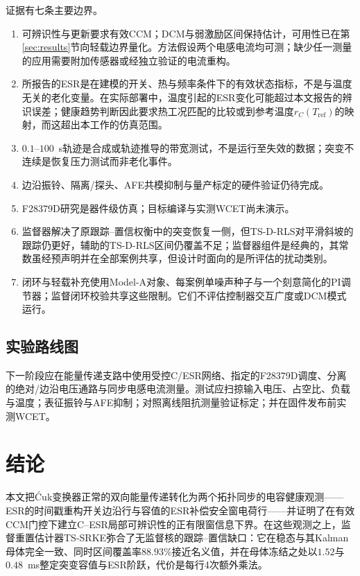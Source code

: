 \documentclass[zihao=5,a4paper]{ctexart}
\DeclareRobustCommand{\Cuk}{\mbox{\'{C}uk}}
\newcommand{\TSRLS}{TS-D-RLS}
\newcommand{\TSSRKE}{TS-SRKE}
\begin{document}
证据有七条主要边界。
\begin{enumerate}
\item 可辨识性与更新要求有效CCM；DCM与弱激励区间保持估计，可用性已在第\ref{sec:results}节向轻载边界量化。方法假设两个电感电流均可测；缺少任一测量的应用需要附加传感器或经独立验证的电流重构。
\item 所报告的ESR是在建模的开关、热与频率条件下的有效状态指标，不是与温度无关的老化变量。在实际部署中，温度引起的ESR变化可能超过本文报告的辨识误差；健康趋势判断因此要求热工况匹配的比较或到参考温度$r_C(T_{\mathrm{ref}})$的映射，而这超出本工作的仿真范围。
\item $0.1$--$100$~s轨迹是合成或轨迹推导的带宽测试，不是运行至失效的数据；突变不连续是恢复压力测试而非老化事件。
\item 边沿振铃、隔离/探头、AFE共模抑制与量产标定的硬件验证仍待完成。
\item F28379D研究是器件级仿真；目标编译与实测WCET尚未演示。
\item 监督器解决了原跟踪--置信权衡中的突变恢复一侧，但\TSRLS{}对平滑斜坡的跟踪仍更好，辅助的\TSRLS{}区间仍覆盖不足；监督器组件是经典的，其常数虽经预声明并在全部案例共享，但设计时面向的是所评估的扰动类别。
\item 闭环与轻载补充使用Model-A对象、每案例单噪声种子与一个刻意简化的PI调节器；监督闭环校验共享这些限制。它们不评估控制器交互广度或DCM模式运行。
\end{enumerate}

\subsection{实验路线图}

下一阶段应在能量传递支路中使用受控C/ESR网络、指定的F28379D调度、分离的绝对/边沿电压通路与同步电感电流测量。测试应扫掠输入电压、占空比、负载与温度；表征振铃与AFE抑制；对照离线阻抗测量验证标定；并在固件发布前实测WCET。

\section{结论}
\label{sec:conclusion}

本文把\Cuk{}变换器正常的双向能量传递转化为两个拓扑同步的电容健康观测——ESR的时间戳重构开关边沿行与容值的ESR补偿安全窗电荷行——并证明了在有效CCM门控下建立C--ESR局部可辨识性的正有限窗信息下界。在这些观测之上，监督重置估计器\TSSRKE{}弥合了无监督核的跟踪--置信缺口：它在稳态与其Kalman母体完全一致、同时区间覆盖率$88.93\%$接近名义值，并在母体冻结之处以$1.52$与$0.48$~ms整定突变容值与ESR阶跃，代价是每行4次额外乘法。
\end{document}
